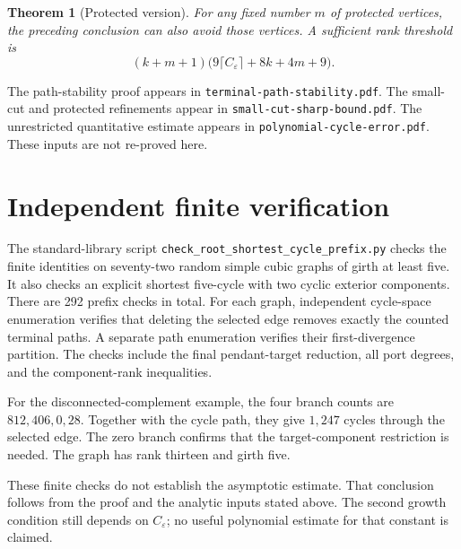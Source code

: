 \documentclass[11pt]{article}
\newtheorem{theorem}{Theorem}[section]
\begin{document}
\begin{theorem}[Protected version]\label{thm:high-density-protected-cyclic-sets}
For any fixed number $m$ of protected vertices, the preceding conclusion can also avoid those vertices.
A sufficient rank threshold is
\[
 (k+m+1)\bigl(9\lceil C_\varepsilon\rceil+8k+4m+9\bigr).
\]
\end{theorem}

The path-stability proof appears in \nolinkurl{terminal-path-stability.pdf}.
The small-cut and protected refinements appear in \nolinkurl{small-cut-sharp-bound.pdf}.
The unrestricted quantitative estimate appears in \nolinkurl{polynomial-cycle-error.pdf}.
These inputs are not re-proved here.



\section{Independent finite verification}
The standard-library script \texttt{check\_root\_shortest\_cycle\_prefix.py} checks the finite identities on seventy-two random simple cubic graphs of girth at least five.
It also checks an explicit shortest five-cycle with two cyclic exterior components.
There are 292 prefix checks in total.
For each graph, independent cycle-space enumeration verifies that deleting the selected edge removes exactly the counted terminal paths.
A separate path enumeration verifies their first-divergence partition.
The checks include the final pendant-target reduction, all port degrees, and the component-rank inequalities.

For the disconnected-complement example, the four branch counts are $812,406,0,28$.
Together with the cycle path, they give $1,247$ cycles through the selected edge.
The zero branch confirms that the target-component restriction is needed.
The graph has rank thirteen and girth five.

These finite checks do not establish the asymptotic estimate.
That conclusion follows from the proof and the analytic inputs stated above.
The second growth condition still depends on $C_\varepsilon$; no useful polynomial estimate for that constant is claimed.
\end{document}

